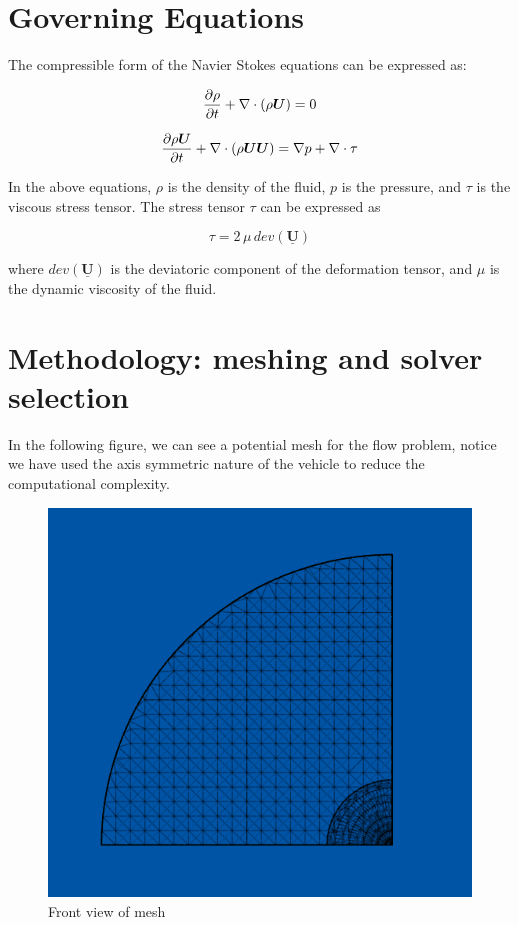 \documentclass[10pt, oneside,english]{article}
\begin{document}
\clearpage
\section{Governing Equations}

The compressible form of the Navier Stokes equations can be expressed as:

\begin{displaymath}
    \pdv{\rho}{t} + \nabla \cdot (\rho \bm{U}) = 0
\end{displaymath}

\begin{displaymath}
    \pdv{\rho \bm{U}}{t} + \nabla \cdot (\rho \bm{U} \bm{U}) = \nabla p + \nabla \cdot \tau
\end{displaymath}

In the above equations, $\rho$ is the density of the fluid, $p$ is the pressure, and $\tau$ is the viscous stress tensor. The stress tensor $\tau$ can be expressed as 

\begin{displaymath}
    \tau = 2\, \mu\, dev(\bm{\underline{U}})
\end{displaymath}

where $dev(\bm{\underline{U}})$ is the deviatoric component of the deformation tensor, and $\mu$ is the dynamic viscosity of the fluid.


\section{Methodology: meshing and solver selection}

In the following figure, we can see a potential mesh for the flow problem, notice we have used the axis symmetric nature of the vehicle to reduce the computational complexity.

\begin{figure}[h!]
    \centering
    \includegraphics[width=0.5\linewidth]{figures/frontview_mesh}
    \caption{Front view of mesh}
    \label{fig:MeshFront}
\end{figure}        
\end{document}
